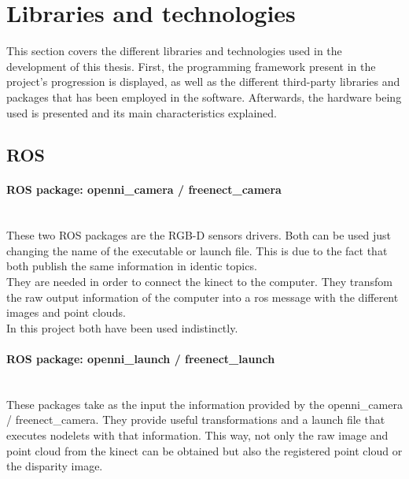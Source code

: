 \newpage
\section{Libraries and technologies}
\label{libraries_and_technologies}

This section covers the different libraries and technologies used in the development of this thesis. First, the programming framework present in the project's progression is displayed, as well as the different third-party libraries and packages that has been employed in the software. Afterwards, the hardware being used is presented and its main characteristics explained. 




	\subsection{ROS}
		\label{technologies_ros}
		\paragraph{ROS package: openni\_camera / freenect\_camera}\mbox{} \\

		These two ROS packages are the RGB-D sensors drivers. Both can be used just changing the name of the executable or launch file. This is due to the fact that both publish the same information in identic topics. 
		\\

		They are needed in order to connect the kinect to the computer. They transfom the raw output information of the computer into a ros message with the different images and point clouds. 
		\\

		In this project both have been used indistinctly.  

		\paragraph{ROS package: openni\_launch / freenect\_launch}\mbox{} \\

		These packages take as the input the information provided by the openni\_camera / freenect\_camera. They provide useful transformations and a launch file that executes nodelets with that information. This way, not only the raw image and point cloud from the kinect can be obtained but also the registered point cloud or the disparity image. 
		\\

